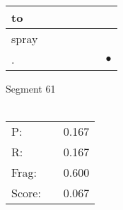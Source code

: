 \documentclass[landscape]{article}
\newcommand{\ssp}{\hspace{2pt}}
\newcommand{\mex}{\cellcolor{g}$\bullet$}
\begin{document}
\begin{tabular}{|l|p{10pt}|p{10pt}|p{10pt}|p{10pt}|p{10pt}|p{10pt}|}
\hline
\ssp to \ssp&\hspace{2pt}&\hspace{2pt}&\hspace{2pt}&\hspace{2pt}&\hspace{2pt}&\hspace{2pt}\\
\hline
\ssp spray \ssp&\hspace{2pt}&\hspace{2pt}&\hspace{2pt}&\hspace{2pt}&\hspace{2pt}&\hspace{2pt}\\
\hline
\ssp \cellcolor{ref5}. \ssp&\hspace{2pt}&\hspace{2pt}&\hspace{2pt}&\hspace{2pt}&\hspace{2pt}&\hspace{2pt}\mex\\
\hline
\end{tabular}

\vspace{6pt}
\noindent Segment 61\\\\
\noindent\begin{tabular}{lm{12pt}r}
\hline
P:&&0.167\\
R:&&0.167\\
Frag:&&0.600\\
Score:&&0.067\\
\end{tabular}

\newpage
\end{document}
